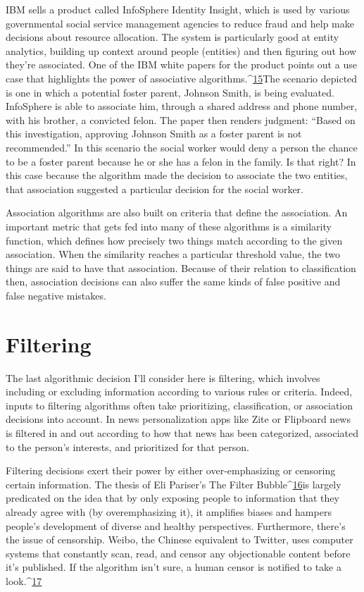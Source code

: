 IBM sells a product called InfoSphere Identity Insight, which is used by various governmental social service management agencies to reduce fraud and help make decisions about resource allocation. The system is particularly good at entity analytics, building up context around people (entities) and then figuring out how they're associated. One of the IBM white papers for the product points out a use case that highlights the power of associative algorithms.^{\href{#endnotes}{15}}The scenario depicted is one in which a potential foster parent, Johnson Smith, is being evaluated. InfoSphere is able to associate him, through a shared address and phone number, with his brother, a convicted felon. The paper then renders judgment: ``Based on this investigation, approving Johnson Smith as a foster parent is not recommended.'' In this scenario the social worker would deny a person the chance to be a foster parent because he or she has a felon in the family. Is that right? In this case because the algorithm made the decision to associate the two entities, that association suggested a particular decision for the social worker. 

Association algorithms are also built on criteria that define the association. An important metric that gets fed into many of these algorithms is a similarity function, which defines how precisely two things match according to the given association. When the similarity reaches a particular threshold value, the two things are said to have that association. Because of their relation to classification then, association decisions can also suffer the same kinds of false positive and false negative mistakes. 

\section{Filtering }
The last algorithmic decision I'll consider here is filtering, which involves including or excluding information according to various rules or criteria. Indeed, inputs to filtering algorithms often take prioritizing, classification, or association decisions into account. In news personalization apps like Zite or Flipboard news is filtered in and out according to how that news has been categorized, associated to the person's interests, and prioritized for that person. 

Filtering decisions exert their power by either over-emphasizing or censoring certain information. The thesis of Eli Pariser's The Filter Bubble^{\href{#endnotes}{16}}is largely predicated on the idea that by only exposing people to information that they already agree with (by overemphasizing it), it amplifies biases and hampers people's development of diverse and healthy perspectives. Furthermore, there's the issue of censorship. Weibo, the Chinese equivalent to Twitter, uses computer systems that constantly scan, read, and censor any objectionable content before it's published. If the algorithm isn't sure, a human censor is notified to take a look.^{\href{#endnotes}{17}}

